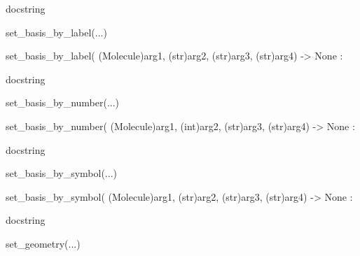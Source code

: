 \documentclass[letterpaper,10pt,english]{sphinxmanual}
\begin{document}
\begin{description}
\begin{description}
\begin{DUlineblock}{0em}
\begin{DUlineblock}{\DUlineblockindent}
\item[]
\begin{DUlineblock}{\DUlineblockindent}
\item[] docstring
\item[] 
\end{DUlineblock}
\end{DUlineblock}
\item[] set\_basis\_by\_label(...)
\item[]
\begin{DUlineblock}{\DUlineblockindent}
\item[] set\_basis\_by\_label( (Molecule)arg1, (str)arg2, (str)arg3, (str)arg4) -\textgreater{} None :
\item[]
\begin{DUlineblock}{\DUlineblockindent}
\item[] docstring
\item[] 
\end{DUlineblock}
\end{DUlineblock}
\item[] set\_basis\_by\_number(...)
\item[]
\begin{DUlineblock}{\DUlineblockindent}
\item[] set\_basis\_by\_number( (Molecule)arg1, (int)arg2, (str)arg3, (str)arg4) -\textgreater{} None :
\item[]
\begin{DUlineblock}{\DUlineblockindent}
\item[] docstring
\item[] 
\end{DUlineblock}
\end{DUlineblock}
\item[] set\_basis\_by\_symbol(...)
\item[]
\begin{DUlineblock}{\DUlineblockindent}
\item[] set\_basis\_by\_symbol( (Molecule)arg1, (str)arg2, (str)arg3, (str)arg4) -\textgreater{} None :
\item[]
\begin{DUlineblock}{\DUlineblockindent}
\item[] docstring
\item[] 
\end{DUlineblock}
\end{DUlineblock}
\item[] set\_geometry(...)
\item[]
\begin{DUlineblock}{\DUlineblockindent}

\end{DUlineblock}
\end{DUlineblock}
\end{description}
\end{description}
\end{document}
